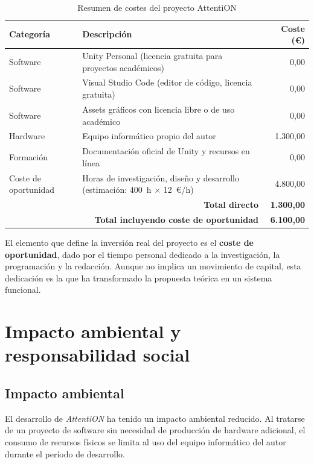 \documentclass[12pt, a4paper]{report}
\begin{document}
\begin{table}[H]
\centering
\caption{Resumen de costes del proyecto AttentiON}
\label{tab:costes}
\renewcommand{\arraystretch}{1.3}
\begin{tabularx}{\textwidth}{|l|X|r|}
\hline
\textbf{Categoría} & \textbf{Descripción} & \textbf{Coste (€)} \\
\hline
Software & Unity Personal (licencia gratuita para proyectos académicos) & 0{,}00 \\
\hline
Software & Visual Studio Code (editor de código, licencia gratuita) & 0{,}00 \\
\hline
Software & Assets gráficos con licencia libre o de uso académico & 0{,}00 \\
\hline
Hardware & Equipo informático propio del autor & 1.300{,}00 \\
\hline
Formación & Documentación oficial de Unity y recursos en línea & 0{,}00 \\
\hline
Coste de oportunidad & Horas de investigación, diseño y desarrollo
  (estimación: 400~h $\times$ 12~€/h) & 4.800{,}00 \\
\hline
\multicolumn{2}{|r|}{\textbf{Total directo}} & \textbf{1.300{,}00} \\
\hline
\multicolumn{2}{|r|}{\textbf{Total incluyendo coste de oportunidad}} &
  \textbf{6.100{,}00} \\
\hline
\end{tabularx}
\end{table}

El elemento que define la inversión real del proyecto es el \textbf{coste de
oportunidad}, dado por el tiempo personal dedicado a la investigación, la
programación y la redacción. Aunque no implica un movimiento de capital, esta
dedicación es la que ha transformado la propuesta teórica en un sistema
funcional.

\section{Impacto ambiental y responsabilidad social}

\subsection{Impacto ambiental}

El desarrollo de \textit{AttentiON} ha tenido un impacto ambiental reducido.
Al tratarse de un proyecto de software sin necesidad de producción de hardware
adicional, el consumo de recursos físicos se limita al uso del equipo informático
del autor durante el período de desarrollo.
\end{document}
